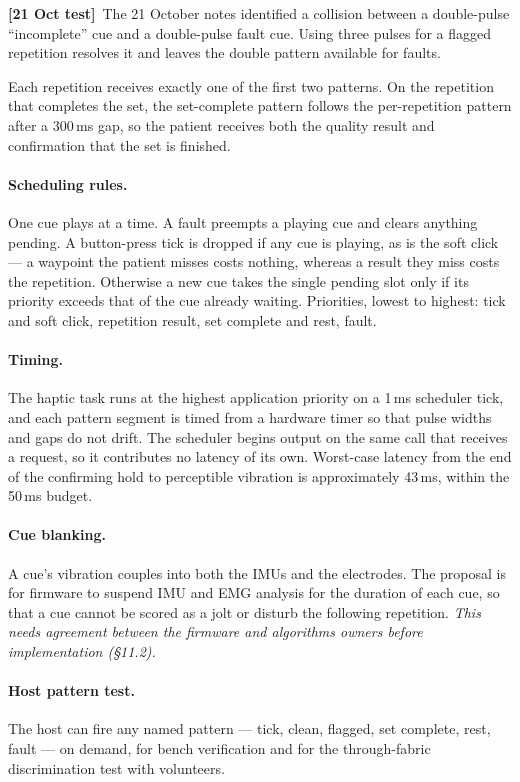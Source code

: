 \documentclass[11pt]{article}
\newcommand{\tested}{{\sffamily\scriptsize\color{good}\textbf{[21 Oct test]}}\ }
\begin{document}
\noindent
\tested The 21 October notes identified a collision between a double-pulse
``incomplete'' cue and a double-pulse fault cue. Using three pulses for a flagged
repetition resolves it and leaves the double pattern available for faults.

\medskip
\noindent
Each repetition receives exactly one of the first two patterns. On the
repetition that completes the set, the set-complete pattern follows the
per-repetition pattern after a 300\,ms gap, so the patient receives both the
quality result and confirmation that the set is finished.

\paragraph{Scheduling rules.} One cue plays at a time. A fault preempts a
playing cue and clears anything pending. A button-press tick is dropped if any
cue is playing, as is the soft click --- a waypoint the patient misses costs
nothing, whereas a result they miss costs the repetition. Otherwise a new cue
takes the single pending slot only if its priority exceeds that of the cue
already waiting. Priorities, lowest to highest: tick and soft click, repetition
result, set complete and rest, fault.

\paragraph{Timing.} The haptic task runs at the highest application priority on
a 1\,ms scheduler tick, and each pattern segment is timed from a hardware timer
so that pulse widths and gaps do not drift. The scheduler begins output on the
same call that receives a request, so it contributes no latency of its own.
Worst-case latency from the end of the confirming hold to perceptible vibration
is approximately 43\,ms, within the 50\,ms budget.

\paragraph{Cue blanking.} A cue's vibration couples into both the IMUs and the
electrodes. The proposal is for firmware to suspend IMU and EMG analysis for the
duration of each cue, so that a cue cannot be scored as a jolt or disturb the
following repetition. \textit{This needs agreement between the firmware and
algorithms owners before implementation (\S11.2).}

\paragraph{Host pattern test.} The host can fire any named pattern --- tick,
clean, flagged, set complete, rest, fault --- on demand, for bench verification
and for the through-fabric discrimination test with volunteers.
\end{document}
